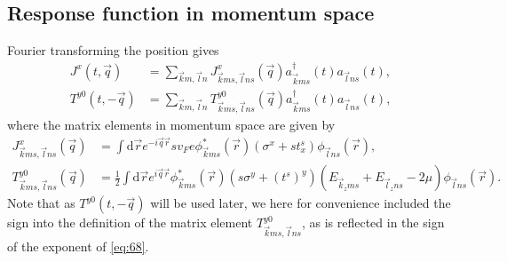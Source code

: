 \subsection{Response function in momentum space}
Fourier transforming the position gives
\begin{align}
  \label{eq:66}
  J^x(t, \vec{q}) &= \sum\limits_{\vec{k}m, \vec{l}n}
                    J^x_{\vec{k}ms, \vec{l}ns}(\vec{q})
                    a^{\dagger}_{\vec{k}ms}(t)
                    a_{\vec{l} ns}(t),\\
  \label{eq:67}
  T^{y 0}(t, -\vec{q}) &= \sum\limits_{\vec{k}m, \vec{l}n}^{}
                    T^{y 0}_{\vec{k}m s, \vec{l}n s}(\vec{q})
                    a^{\dagger}_{\vec{k}m s}(t)
                    a_{\vec{l} n s}(t),
\end{align}
where the matrix elements in momentum space are given by
\begin{align}
  J^x_{\vec{k}ms, \vec{l}ns}(\vec{q}) &=  \int \mathrm{d} \vec{r} e^{-i \vec{q} \vec{r}} s v_F e \phi ^{*}_{\vec{k}ms} (\vec{r}) (\sigma^x + s t^s_x) \phi _{\vec{l}ns}(\vec{r}),\\
  \label{eq:68}
  T^{y 0}_{\vec{k}m s, \vec{l} n s}(\vec{q}) &= \frac{1}{2}
                                                \int \mathrm{d}\vec{r} e^{i\vec{q}\vec{r}}
                                              \phi ^{*}_{\vec{k}m s}(\vec{r})
                                              (s \sigma ^y + (t^s)^y)
                                                (E_{\vec{k}_z m s} + E_{\vec{l}_z n  s} - 2 \mu ) \phi _{\vec{l} n  s}(\vec{r}).
\end{align}
Note that as $T^{y 0}(t, -\vec{q})$ will be used later, we here for convenience included the sign into the definition of the matrix element  $T^{y 0}_{\vec{k}ms, \vec{l}ns}$, as is reflected in the sign of the exponent of \cref{eq:68}.

